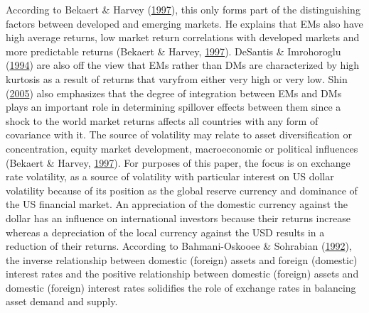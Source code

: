 \documentclass[11pt,preprint, authoryear]{elsarticle}
\numberwithin{equation}{section}
\numberwithin{figure}{section}
\numberwithin{table}{section}
\begin{document}
According to Bekaert \& Harvey
(\protect\hyperlink{ref-bekaert1997}{1997}), this only forms part of the
distinguishing factors between developed and emerging markets. He
explains that EMs also have high average returns, low market return
correlations with developed markets and more predictable returns
(Bekaert \& Harvey, \protect\hyperlink{ref-bekaert1997}{1997}). DeSantis
\& Imrohoroglu (\protect\hyperlink{ref-desantis1994}{1994}) are also off
the view that EMs rather than DMs are characterized by high kurtosis as
a result of returns that varyfrom either very high or very low. Shin
(\protect\hyperlink{ref-shin2005}{2005}) also emphasizes that the degree
of integration between EMs and DMs plays an important role in
determining spillover effects between them since a shock to the world
market returns affects all countries with any form of covariance with
it. The source of volatility may relate to asset diversification or
concentration, equity market development, macroeconomic or political
influences (Bekaert \& Harvey,
\protect\hyperlink{ref-bekaert1997}{1997}). For purposes of this paper,
the focus is on exchange rate volatility, as a source of volatility with
particular interest on US dollar volatility because of its position as
the global reserve currency and dominance of the US financial market. An
appreciation of the domestic currency against the dollar has an
influence on international investors because their returns increase
whereas a depreciation of the local currency against the USD results in
a reduction of their returns. According to Bahmani-Oskooee \& Sohrabian
(\protect\hyperlink{ref-bahmani1992}{1992}), the inverse relationship
between domestic (foreign) assets and foreign (domestic) interest rates
and the positive relationship between domestic (foreign) assets and
domestic (foreign) interest rates solidifies the role of exchange rates
in balancing asset demand and supply.
\end{document}
